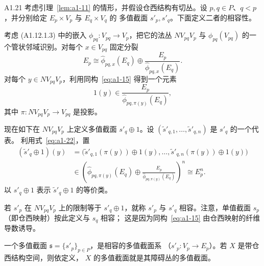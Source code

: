 \begin{definition}{A1.21}\label{def:a1-21}
考虑引理~\ref{lem:a1-11} 的情形，并假设仓西结构有切丛。设
$p,q\in P$、$q<p$，并分别给定 $E_p\times V_p$ 与 $E_q\times V_q$ 的
多值截面 $s'_p,s'_q$。下面定义二者的相容性。

考虑 (A1.12.1.3) 中的嵌入 $\phi_{pq}\colon V_{pq}\to V_p$，把它的法丛
$NV_{pq}V_p$ 与 $\phi_{pq}(V_{pq})$ 的一个管状邻域识别。对每个
$x\in V_{pq}$ 固定分裂
\begin{equation}
 E_p\cong
 \widehat\phi_{pq,x}(E_q)
 \oplus\frac{E_p}{\widehat\phi_{pq,x}(E_q)}.
 \tag{A1.22}\label{eq:a1-22}
\end{equation}
对每个 $y\in NV_{pq}V_p$，利用同构~\eqref{eq:a1-15} 得到一个元素
\[
 1(y)\in\frac{E_p}{\widehat\phi_{pq,\pi(y)}(E_q)},
\]
其中 $\pi\colon NV_{pq}V_p\to V_{pq}$ 是投影。

现在如下在 $NV_{pq}V_p$ 上定义多值截面 $s'_q\oplus1$。设
$(\widetilde s'_{q,1},\ldots,\widetilde s'_{q,n})$ 是 $s'_q$ 的一个代表。
利用式~\eqref{eq:a1-22}，置
\[
\begin{aligned}
 (\widetilde s'_q\oplus1)(y)
 &=\bigl(
   \widetilde s'_{q,1}(\pi(y))\oplus1(y),\ldots,
   \widetilde s'_{q,n}(\pi(y))\oplus1(y)
  \bigr)\\
 &\in
 \left(
  \widehat\phi_{pq,\pi(y)}(E_q)
  \oplus\frac{E_p}{\widehat\phi_{pq,\pi(y)}(E_q)}
 \right)^n
 \cong E_p^n.
\end{aligned}
\]
以 $s'_q\oplus1$ 表示 $\widetilde s'_q\oplus1$ 的等价类。

若 $s'_p$ 在 $NV_{pq}V_p$ 上的限制等于 $s'_q\oplus1$，就称 $s'_p$ 与
$s'_q$ 相容。注意，单值截面 $s_p$（即仓西映射）按此定义与 $s_q$ 相容；
这是因为同构~\eqref{eq:a1-15} 由仓西映射的纤维导数诱导。

一个多值截面 $\mathfrak s=\{s'_p\}_{p\in P}$，是相容的多值截面系
（$s'_p\colon V_p\to E_p$）。若 $X$ 是带仓西结构空间，则依定义，
$X$ 的多值截面就是其障碍丛的多值截面。
\end{definition}

